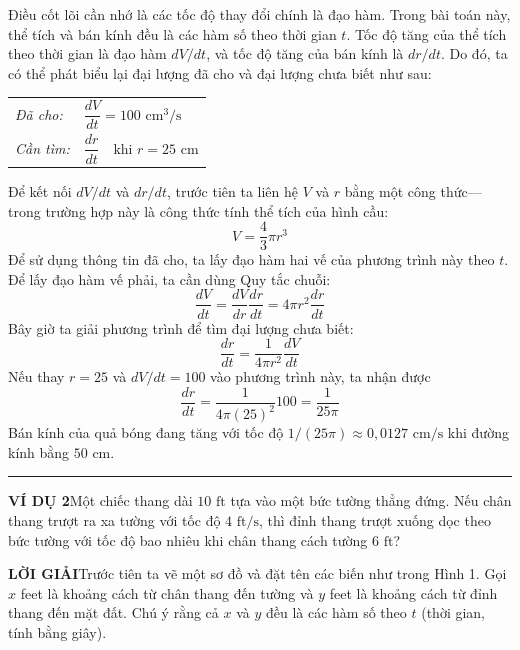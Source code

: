 \begin{minipage}[t]{360pt}
  \vspace{0pt}
  \fontsize{9.5}{13}\selectfont
  Điều cốt lõi cần nhớ là các tốc độ thay đổi chính là đạo hàm. Trong bài toán này, thể tích và bán kính đều là các hàm số theo thời gian $t$. Tốc độ tăng của thể tích theo thời gian là đạo hàm $dV/dt$, và tốc độ tăng của bán kính là $dr/dt$. Do đó, ta có thể phát biểu lại đại lượng đã cho và đại lượng chưa biết như sau:
  
  \vspace{4pt}
  \begin{center}
  \renewcommand{\arraystretch}{1.3}
  \begin{tabular}{ll}
      \textit{Đã cho:} & $\dfrac{dV}{dt} = 100\text{ cm}^3/\text{s}$ \\[8pt]
      \textit{Cần tìm:} & $\dfrac{dr}{dt}\quad\text{khi } r = 25\text{ cm}$
  \end{tabular}
  \end{center}
  \vspace{3pt}

  Để kết nối $dV/dt$ và $dr/dt$, trước tiên ta liên hệ $V$ và $r$ bằng một công thức---trong trường hợp này là công thức tính thể tích của hình cầu:
  \[
  V = \frac{4}{3}\pi r^3
  \]
  Để sử dụng thông tin đã cho, ta lấy đạo hàm hai vế của phương trình này theo $t$. Để lấy đạo hàm vế phải, ta cần dùng Quy tắc chuỗi:
  \[
  \frac{dV}{dt} = \frac{dV}{dr} \frac{dr}{dt} = 4\pi r^2 \frac{dr}{dt}
  \]
  Bây giờ ta giải phương trình để tìm đại lượng chưa biết:
  \[
  \frac{dr}{dt} = \frac{1}{4\pi r^2} \frac{dV}{dt}
  \]
  Nếu thay $r = 25$ và $dV/dt = 100$ vào phương trình này, ta nhận được
  \[
  \frac{dr}{dt} = \frac{1}{4\pi (25)^2} 100 = \frac{1}{25\pi}
  \]
  Bán kính của quả bóng đang tăng với tốc độ $1/(25\pi) \approx 0{,}0127\text{ cm/s}$ khi đường kính bằng $50\text{ cm}$.\hfill{\color{stewartcyan}\rule{1.1ex}{1.1ex}}

  \vspace{10pt}
  \noindent\textbf{\textsf{\color{stewartcyan}VÍ DỤ 2}}\hspace{0.8em}Một chiếc thang dài $10\text{ ft}$ tựa vào một bức tường thẳng đứng. Nếu chân thang trượt ra xa tường với tốc độ $4\text{ ft/s}$, thì đỉnh thang trượt xuống dọc theo bức tường với tốc độ bao nhiêu khi chân thang cách tường $6\text{ ft}$?

  \vspace{5pt}
  \noindent\textbf{\textsf{\color{stewartcyan}LỜI GIẢI}}\hspace{0.8em}Trước tiên ta vẽ một sơ đồ và đặt tên các biến như trong Hình 1. Gọi $x$ feet là khoảng cách từ chân thang đến tường và $y$ feet là khoảng cách từ đỉnh thang đến mặt đất. Chú ý rằng cả $x$ và $y$ đều là các hàm số theo $t$ (thời gian, tính bằng giây).


\end{minipage}
